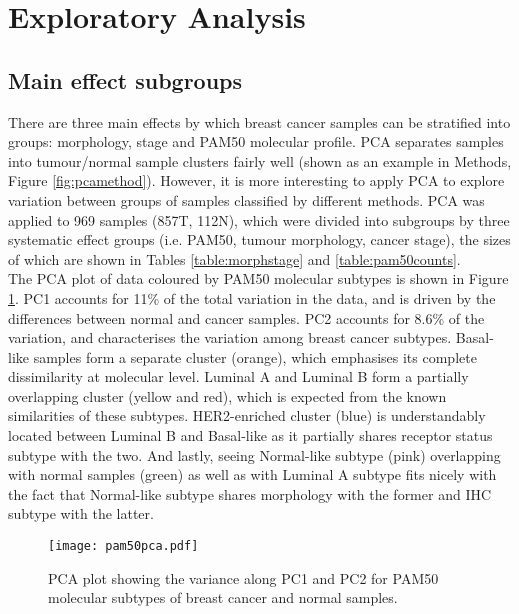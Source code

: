     
\section{Exploratory Analysis}


    \subsection{Main effect subgroups}

    There are three main effects by which breast cancer samples can be stratified into groups: morphology, stage and PAM50 molecular profile. PCA separates samples into tumour/normal sample clusters fairly well (shown as an example in Methods, Figure \ref{fig:pcamethod}). However, it is more interesting to apply PCA to explore variation between groups of samples classified by different methods.  
    PCA was applied to 969 samples (857T, 112N), which were divided into subgroups by three systematic effect groups (i.e. PAM50, tumour morphology, cancer stage), the sizes of which are shown in Tables \ref{table:morphstage} and \ref{table:pam50counts}. \\
    The PCA plot of data coloured by PAM50 molecular subtypes is shown in Figure \ref{fig:pcapam50}. PC1 accounts for 11\% of the total variation in the data, and is driven by the differences between normal and cancer samples. PC2 accounts for 8.6\% of the variation, and characterises the variation among breast cancer subtypes. Basal-like samples form a separate cluster (orange), which emphasises its complete dissimilarity at molecular level. Luminal A and Luminal B form a partially overlapping cluster (yellow and red), which is expected from the known similarities of these subtypes. HER2-enriched cluster (blue) is understandably located between Luminal B and Basal-like as it partially shares receptor status subtype with the two. And lastly, seeing Normal-like subtype (pink) overlapping with normal samples (green) as well as with Luminal A subtype fits nicely with the fact that Normal-like subtype shares morphology with the former and IHC subtype with the latter.    
    
            \begin{figure}[!h]
            \centering
            \texttt{[image: pam50pca.pdf]} 
            \caption[PCA plot showing separation by PAM50 subtypes(2D)]{PCA plot showing the variance along PC1 and PC2 for PAM50 molecular subtypes of breast cancer and normal samples.}
            \label{fig:pcapam50}
            \end{figure}
            
